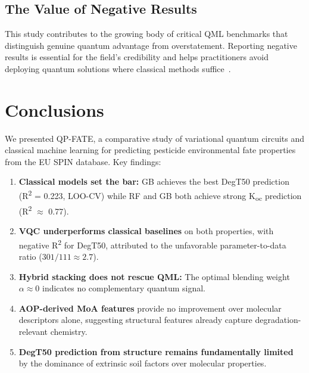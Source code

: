 \documentclass[12pt,a4paper]{article}
\newcommand{\degtl}{DegT50}
\newcommand{\koc}{K\textsubscript{oc}}
\newcommand{\rtwo}{R\textsuperscript{2}}
\newcommand{\loocv}{LOO-CV}
\newcommand{\nparams}{301}
\newcommand{\nsub}{111}
\begin{document}
\subsection{The Value of Negative Results}

This study contributes to the growing body of critical QML benchmarks that
distinguish genuine quantum advantage from overstatement. Reporting negative results
is essential for the field's credibility and helps practitioners avoid
deploying quantum solutions where classical methods
suffice~\citep{cerezo2021}.


\section{Conclusions}
\label{sec:conclusions}

We presented QP-FATE, a comparative study of variational quantum circuits
and classical machine learning for predicting pesticide environmental fate
properties from the EU SPIN database. Key findings:

\begin{enumerate}
  \item \textbf{Classical models set the bar:} GB achieves the best
        \degtl{} prediction (\rtwo{} = 0.223, \loocv{}) while RF and GB
        both achieve strong \koc{} prediction (\rtwo{} $\approx$ 0.77).

  \item \textbf{VQC underperforms classical baselines} on both properties,
        with negative \rtwo{} for \degtl{}, attributed to the unfavorable
        parameter-to-data ratio ($\nparams{}/\nsub{} \approx 2.7$).

  \item \textbf{Hybrid stacking does not rescue QML:} The optimal blending
        weight $\alpha \approx 0$ indicates no complementary quantum signal.

  \item \textbf{AOP-derived MoA features} provide no improvement over
        molecular descriptors alone, suggesting structural features already
        capture degradation-relevant chemistry.

  \item \textbf{DegT50 prediction from structure remains fundamentally
        limited} by the dominance of extrinsic soil factors over molecular
        properties.
\end{enumerate}
\end{document}
